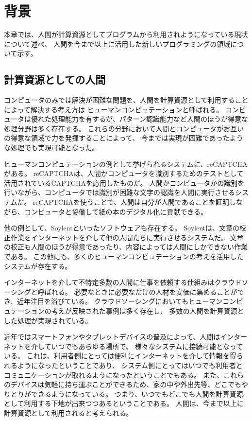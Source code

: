 \chapter{背景}\label{chap:background}

本章では、人間が計算資源としてプログラムから利用されようになっている現状について述べ、
人間を今まで以上に活用した新しいプログラミングの領域について示す。

\section{計算資源としての人間}\label{sec:human-as-computational-resources}

コンピュータのみでは解決が困難な問題を、人間を計算資源として利用することによって解決する考え方は
ヒューマンコンピュテーション\cite{humancomputation}と呼ばれる。
コンピュータは優れた処理能力を有するが、パターン認識能力など人間のほうが得意な処理分野は多く存在する。
これらの分野において人間とコンピュータがお互いの得意な領域で力を発揮することによって、
今までは実現が困難であったような処理でも実現可能となった。

ヒューマンコンピュテーションの例として挙げられるシステムに、reCAPTCHA\cite{recaptcha}がある。
reCAPTCHAは、人間かコンピュータを識別するためのテストとして活用されているCAPTCHA\cite{captcha}を応用したものだ。
人間かコンピュータかの識別を行いながら、コンピュータでは識別が困難な文字の認識を人間に実行させるシステムだ。
reCAPTCHAを使うことで、人間は自分が人間であることを証明しながら、コンピュータと協働して紙の本のデジタル化に貢献できる。

他の例として、Soylent\cite{soylent}といったソフトウェアも存在する。
Soylentは、文章の校正作業をインターネットを介して他の人間たちに実行させるシステムだ。
文章の校正も人間のほうが得意であったり、内容によっては人間にしかできない作業である。
この他にも、多くのヒューマンコンピュテーションの考えを活用したシステムが存在する。

インターネットを介して不特定多数の人間に仕事を依頼する仕組みはクラウドソーシング\cite{riseofcrowdsourcing}と呼ばれる。
必要なときに必要なだけの人材を安価に集めることができ、近年注目を浴びている。
クラウドソーシングにおいてもヒューマンコンピュテーションの考えが反映された事例は多く存在し、
多数の人間を計算資源とした処理が実現されている。

近年ではスマートフォンやタブレットデバイスの普及によって、人間はインターネットを介していつでもあらゆる場所で、
様々なシステムに接続可能となっている。
これは、利用者側にとっては便利にインターネットを介して情報を得られるようになったということであり、
システム側にとってはいつでも利用者とコミュニケーションが取れるようになったということでもある。
また、これらのデバイスは気軽に持ち運ぶことができるため、家の中や外出先等、どこでもやりとりができるようになっている。
つまり、いつでもどこでも人間を計算資源として利用する下地が出来つつあるということである。
人間は、今まで以上に計算資源として利用されると考えられる。

